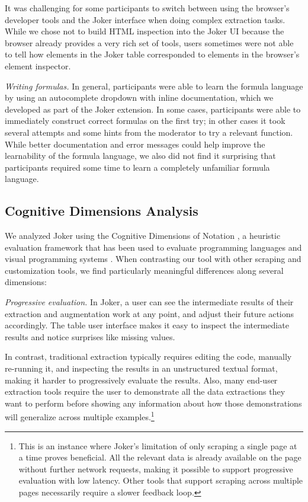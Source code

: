 \documentclass[conference]{IEEEtran}
\begin{document}
It was challenging for some participants to switch between using the
browser's developer tools and the Joker interface when doing complex
extraction tasks. While we chose not to build HTML inspection into the
Joker UI because the browser already provides a very rich set of tools,
users sometimes were not able to tell how elements in the Joker table
corresponded to elements in the browser's element inspector.

\emph{Writing formulas.} In general, participants were able to learn the
formula language by using an autocomplete dropdown with inline
documentation, which we developed as part of the Joker extension. In
some cases, participants were able to immediately construct correct
formulas on the first try; in other cases it took several attempts and
some hints from the moderator to try a relevant function. While better
documentation and error messages could help improve the learnability of
the formula language, we also did not find it surprising that
participants required some time to learn a completely unfamiliar formula
language.

\hypertarget{cognitive-dimensions-analysis}{%
\subsection{Cognitive Dimensions
Analysis}\label{cognitive-dimensions-analysis}}

We analyzed Joker using the Cognitive Dimensions of Notation
\citep{blackwell2001}, a heuristic evaluation framework that has been
used to evaluate programming languages and visual programming systems
\citep{satyanarayan2014, satyanarayan2014a, ledo2018}. When contrasting
our tool with other scraping and customization tools, we find
particularly meaningful differences along several dimensions:

\emph{Progressive evaluation.} In Joker, a user can see the intermediate
results of their extraction and augmentation work at any point, and
adjust their future actions accordingly. The table user interface makes
it easy to inspect the intermediate results and notice surprises like
missing values.

In contrast, traditional extraction typically requires editing the code,
manually re-running it, and inspecting the results in an unstructured
textual format, making it harder to progressively evaluate the results.
Also, many end-user extraction tools \citep{chasins2018, lin2009}
require the user to demonstrate all the data extractions they want to
perform before showing any information about how those demonstrations
will generalize across multiple examples.\footnote{This is an instance
  where Joker's limitation of only scraping a single page at a time
  proves beneficial. All the relevant data is already available on the
  page without further network requests, making it possible to support
  progressive evaluation with low latency. Other tools that support
  scraping across multiple pages necessarily require a slower feedback
  loop.}
\end{document}
